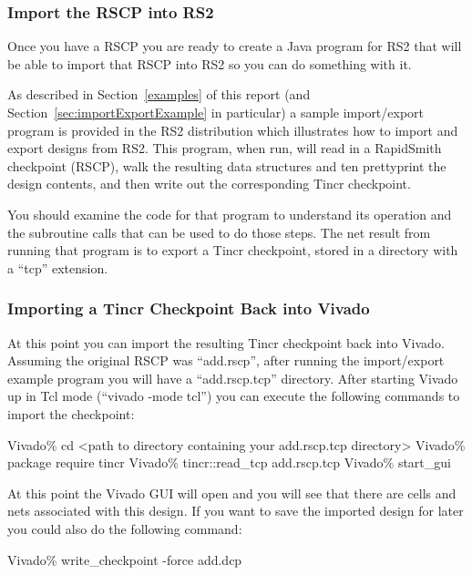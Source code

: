 \subsubsection{Import the RSCP into RS2}
Once you have a RSCP you are ready to create a Java program for RS2 that will be
able to import that RSCP into RS2 so you can do something with it.

As described in Section~\ref{examples} of this report (and
Section~\ref{sec:importExportExample} in particular) a sample import/export program
is provided in the RS2 distribution which illustrates how to import
and export designs from RS2.  This program, when run, will read in a
RapidSmith checkpoint (RSCP), walk the resulting data structures and
ten prettyprint the design contents, and then write out the
corresponding Tincr checkpoint.   

You should examine the code for that
program to understand its operation and the subroutine calls that can
be used to do those steps.  The net result from running that program
is to export a Tincr checkpoint, stored in a directory with a ``tcp'' extension.

\subsubsection{Importing a Tincr Checkpoint Back into Vivado}
At this point you can import the resulting Tincr checkpoint back into Vivado. 
Assuming the original RSCP was ``add.rscp'', after running the import/export
example program  you will have a ``add.rscp.tcp'' directory.  After starting
Vivado up in Tcl mode (``vivado -mode tcl'') you can execute the following
commands to import the checkpoint:

\vspace{-0.15in}  \begin{code}
	Vivado\% cd <path to directory containing your add.rscp.tcp directory>
	Vivado\% package require tincr
	Vivado\% tincr::read_tcp add.rscp.tcp
	Vivado\% start_gui
\end{code}

At this point the Vivado GUI will open and you will see that there are cells and
nets associated with this design.  If you want to save the imported design for
later you could also do the following command:

\vspace{-0.15in}  \begin{code}
	Vivado\% write_checkpoint -force add.dcp
\end{code}

